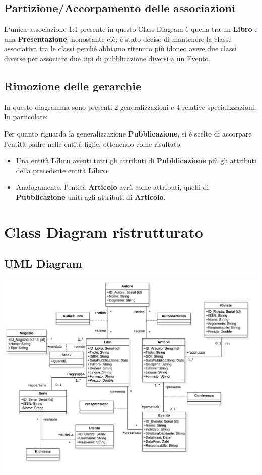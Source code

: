        \subsection{Partizione/Accorpamento delle associazioni}
        L`unica associazione 1:1 presente in questo Class Diagram \`e quella tra un \textbf{Libro} e una \textbf{Presentazione},
        nonostante ci\`o, \`e stato deciso di mantenere la classe associativa tra le classi perch\'e abbiamo ritenuto pi\`u idoneo
        avere due classi diverse per associare due tipi di pubblicazione diversi a un Evento.

            
        \subsection{Rimozione delle gerarchie}
            In questo diagramma sono presenti 2 generalizzazioni e 4 relative specializzazioni.
            In particolare:

            Per quanto riguarda la generalizzazione \textbf{Pubblicazione}, si \`e scelto di accorpare l'entit\`a padre
            nelle entit\`a figlie, ottenendo come risultato:
            \begin{itemize}
                  \item Una entit\`a \textbf{Libro} aventi tutti gli attributi di \textbf{Pubblicazione} pi\`u
                        gli attributi della precedente entit\`a \textbf{Libro}.
                  \item Analogamente, l'entit\`a \textbf{Articolo} avr\`a come attributi, quelli di \textbf{Pubblicazione}
                        uniti agli attributi di \textbf{Articolo}.
            \end{itemize}
    
    \section{Class Diagram ristrutturato}
    \subsection{UML Diagram}
    \includegraphics[scale=0.15]{Immagini/SchemaRistrutturato.png}
